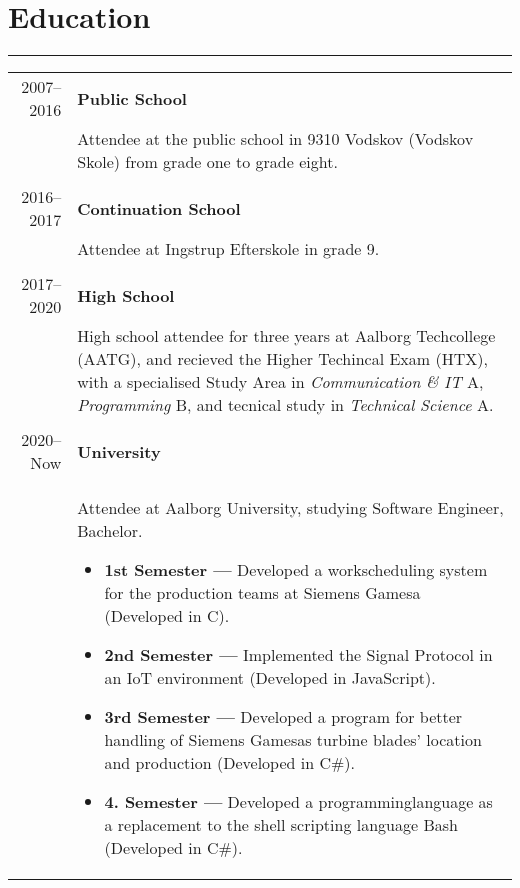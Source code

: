 \documentclass{article}
\begin{document}
\section*{Education}
\hrule width5cm
\begin{longtabu} to \textwidth {r|X}
2007--2016 & \textbf{Public School}\\
&   Attendee at the public school in 9310 Vodskov (Vodskov Skole) from grade one to grade eight.
    \\\\
2016--2017 & \textbf{Continuation School}\\
&   Attendee at Ingstrup Efterskole in grade 9.
    \\\\
2017--2020 & \textbf{High School}\\
&   High school attendee for three years at Aalborg Techcollege (AATG), and recieved the Higher
        Techincal Exam (HTX), with a specialised Study Area in \textit{Communication \& IT} A,
        \textit{Programming} B, and tecnical study in \textit{Technical Science} A. \\\\
2020--Now & \textbf{University}\\
&   Attendee at Aalborg University, studying Software Engineer, Bachelor.
    \begin{itemize}
        \item[] \textbf{1st Semester --- } Developed a workscheduling system for the production
            teams at Siemens Gamesa (Developed in C).
        \item[] \textbf{2nd Semester --- } Implemented the Signal Protocol in an IoT environment
            (Developed in JavaScript).
        \item[] \textbf{3rd Semester --- } Developed a program for better handling of
            Siemens Gamesas turbine blades' location and production (Developed in C\#).
        \item[] \textbf{4. Semester --- } Developed a programminglanguage as a replacement to the shell scripting language Bash (Developed in C\#).
    \end{itemize}
\end{longtabu}
 
\end{document}
